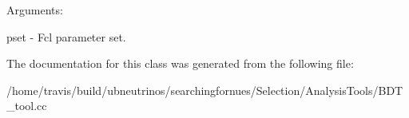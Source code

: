Arguments\+:

pset -\/ Fcl parameter set. 

The documentation for this class was generated from the following file\+:\begin{DoxyCompactItemize}
\item 
/home/travis/build/ubneutrinos/searchingfornues/\+Selection/\+Analysis\+Tools/B\+D\+T\+\_\+tool.\+cc\end{DoxyCompactItemize}
